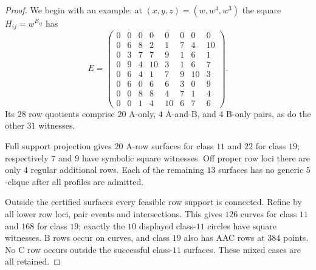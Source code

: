 \documentclass[11pt,a4paper]{article}
\theoremstyle{plain}
\theoremstyle{definition}
\numberwithin{equation}{section}
\begin{document}
\begin{proof}
We begin with an example: at $(x,y,z)=(w,w^4,w^3)$ the square $H_{ij}=w^{E_{ij}}$ has
$$
E=\begin{pmatrix}
0&0&0&0&0&0&0&0\\
0&6&8&2&1&7&4&10\\
0&3&7&7&9&1&6&1\\
0&9&4&10&3&1&6&7\\
0&6&4&1&7&9&10&3\\
0&6&0&6&6&3&0&9\\
0&0&8&8&4&7&1&4\\
0&0&1&4&10&6&7&6
\end{pmatrix}.
$$
Its $28$ row quotients comprise $20$ A-only, $4$ A-and-B, and $4$ B-only pairs, as do the other $31$ witnesses.

Full support projection gives $20$ A-row surfaces for class $11$ and $22$ for class $19$; respectively $7$ and $9$ have symbolic square witnesses. Off proper row loci there are only $4$ regular additional rows. Each of the remaining $13$ surfaces has no generic $5$-clique after all profiles are admitted.

Outside the certified surfaces every feasible row support is connected. Refine by all lower row loci, pair events and intersections. This gives $126$ curves for class $11$ and $168$ for class $19$; exactly the $10$ displayed class-$11$ circles have square witnesses. B rows occur on curves, and class $19$ also has AAC rows at $384$ points. No C row occurs outside the successful class-$11$ surfaces. These mixed cases are all retained.


\end{proof}
\end{document}
